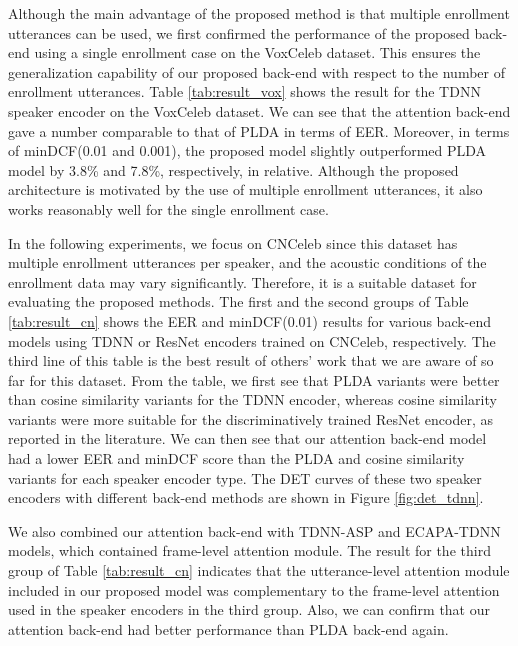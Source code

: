 \documentclass{article}
\begin{document}
Although the main advantage of the proposed method is that multiple enrollment utterances can be used, we first confirmed the performance of the proposed back-end using a single enrollment case on the VoxCeleb dataset. This ensures the generalization capability of our proposed back-end with respect to the number of enrollment utterances. Table \ref{tab:result_vox} shows the result for the TDNN speaker encoder on the VoxCeleb dataset. We can see that the attention back-end gave a number comparable to that of PLDA in terms of EER. Moreover, in terms of minDCF(0.01 and 0.001), the proposed model slightly outperformed PLDA model by 3.8\% and 7.8\%, respectively, in relative. Although the proposed architecture is motivated by the use of multiple enrollment utterances, it also works reasonably well for the single enrollment case. 


In the following experiments, we focus on CNCeleb since this dataset has multiple enrollment utterances per speaker, and the acoustic conditions of the enrollment data may vary significantly. Therefore, it is a suitable dataset for evaluating the proposed methods. The first and the second groups of Table \ref{tab:result_cn} shows the EER and minDCF(0.01) results for various back-end models using TDNN or ResNet encoders trained on CNCeleb, respectively. The third line of this table is the best result of others' work that we are aware of so far for this dataset.
From the table, we first see that PLDA variants were better than cosine similarity variants for the TDNN encoder, whereas cosine similarity variants were more suitable for the discriminatively trained ResNet encoder, as reported in the literature. We can then see that our attention back-end model had a lower EER and minDCF score than the PLDA and cosine similarity variants for each speaker encoder type. 
The DET curves of these two speaker encoders with different back-end methods are shown in Figure \ref{fig:det_tdnn}.


We also combined our attention back-end with TDNN-ASP and ECAPA-TDNN models, which contained frame-level attention module. The result for the third group of Table \ref{tab:result_cn} indicates that the utterance-level attention module included in our proposed model was complementary to the frame-level attention used in the speaker encoders in the third group. Also, we can confirm that our attention back-end had better performance than PLDA back-end again.
\vspace{-1mm}
 
\end{document}
